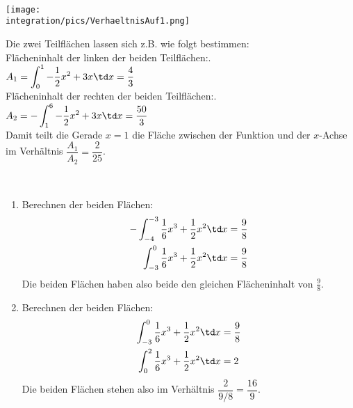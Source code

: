 \begin{Answer}[ref=verhaltnisFlaechenA1]\\
	\begin{minipage}{\textwidth}
		\begin{minipage}{.4\textwidth}
			\texttt{[image: \\integration/pics/VerhaeltnisAuf1.png]}
		\end{minipage}
		\begin{minipage}{.6\textwidth}\raggedright
			Die zwei Teilflächen lassen sich z.B. wie folgt bestimmen:\\
			Flächeninhalt der linken der beiden Teilflächen:.\\
			\(\displaystyle A_1=\int_{0}^1 -\frac{1}{2}x^2+3x \td x=\frac{4}{3}\)\\
			Flächeninhalt der rechten der beiden Teilflächen:.\\
			\(\displaystyle A_2=-\int_1^6 -\frac{1}{2}x^2+3x \td x=\frac{50}{3}\)\\
			Damit teilt die Gerade \(x=1\) die Fläche zwischen der Funktion und der \(x\)-Achse im Verhältnis \(\dfrac{A_1}{A_2}=\dfrac{2}{25}\).\\
		\end{minipage}
	\end{minipage}
\end{Answer}
\begin{Answer}[ref=verhaltnisFlaechenA2]\\
	\begin{enumerate}[label=\alph*)]
		\item Berechnen der beiden Flächen:
		\begin{align*}
			-\int_{-4}^{-3}\frac{1}{6}x^3+\frac{1}{2}x^2 \td x&=\frac{9}{8}\\
			\int_{-3}^{0}\frac{1}{6}x^3+\frac{1}{2}x^2 \td x&=\frac{9}{8}
		\end{align*}
		Die beiden Flächen haben also beide den gleichen Flächeninhalt von \(\frac{9}{8}\).
		\item Berechnen der beiden Flächen:
		\begin{align*}
			\int_{-3}^{0}\frac{1}{6}x^3+\frac{1}{2}x^2 \td x&=\frac{9}{8}\\		
			\int_{0}^{2}\frac{1}{6}x^3+\frac{1}{2}x^2 \td x&=2
		\end{align*}
		Die beiden Flächen stehen also im Verhältnis \(\dfrac{2}{9/8}=\dfrac{16}{9}\).	
	\end{enumerate}
\end{Answer}
